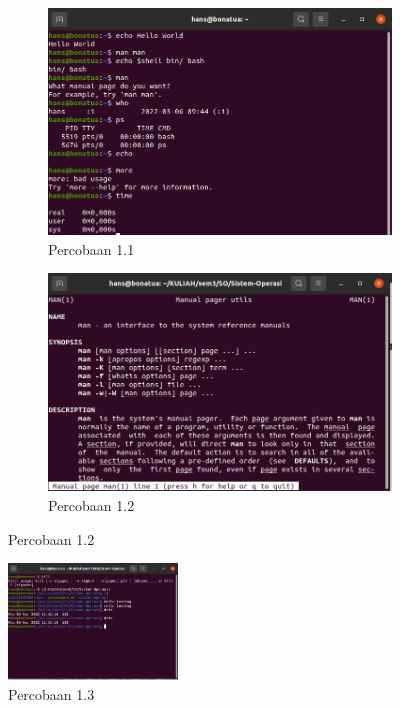 \documentclass[11pt,a4paper]{article}
\begin{document}
\begin{figure}[h]
	\centering
	\begin{subfigure}[b]{0.4\textwidth}
		\centering
		\def\svgwidth{\columnwidth}
		\includegraphics[width=1\textwidth]{Figure/tut1a.png}
		\caption{Percobaan 1.1}
		\label{fig:aug-1}
	\end{subfigure}
	\qquad %
	\begin{subfigure}[b]{0.4\textwidth}
		\centering
		\def\svgwidth{\columnwidth}
		\includegraphics[width=1\textwidth]{Figure/tut1.1.png}
		\caption{Percobaan 1.2}
		\label{fig:aug-2}
	\end{subfigure}
	
\end{figure}

\begin{figure}[h]
    \centering
    \includegraphics[width=0.4\textwidth]{Figure/tut1b.png}
    \caption{Percobaan 1.3}
\end{figure}
\end{document}
